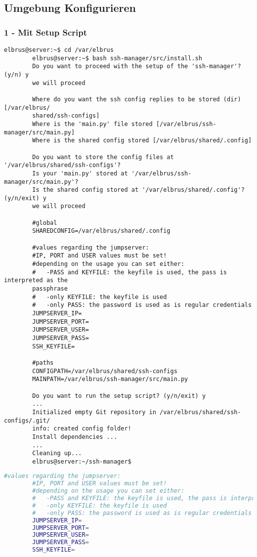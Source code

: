 	\subsection[file config]{Umgebung Konfigurieren}
	\subsubsection{1 - Mit Setup Script}
	
	\lstset{style=commands}
	\begin{lstlisting}[caption={Ausführen des 'install.sh' Scripts.}]
		elbrus@server:~$ cd /var/elbrus
		elbrus@server:~$ bash ssh-manager/src/install.sh
		Do you want to proceed with the setup of the 'ssh-manager'? (y/n) y
		we will proceed
		
		Where do you want the ssh config replies to be stored (dir) [/var/elbrus/
		shared/ssh-configs]
		Where is the 'main.py' file stored [/var/elbrus/ssh-manager/src/main.py]
		Where is the shared config stored [/var/elbrus/shared/.config]
		
		Do you want to store the config files at '/var/elbrus/shared/ssh-configs'?
		Is your 'main.py' stored at '/var/elbrus/ssh-manager/src/main.py'?
		Is the shared config stored at '/var/elbrus/shared/.config'? (y/n/exit) y
		we will proceed
		
		#global
		SHAREDCONFIG=/var/elbrus/shared/.config
		
		#values regarding the jumpserver:
		#IP, PORT and USER values must be set!
		#depending on the usage you can set either:
		#   -PASS and KEYFILE: the keyfile is used, the pass is interpreted as the
		passphrase
		#   -only KEYFILE: the keyfile is used
		#   -only PASS: the password is used as is regular credentials
		JUMPSERVER_IP=
		JUMPSERVER_PORT=
		JUMPSERVER_USER=
		JUMPSERVER_PASS=
		SSH_KEYFILE=
		
		#paths
		CONFIGPATH=/var/elbrus/shared/ssh-configs
		MAINPATH=/var/elbrus/ssh-manager/src/main.py
		
		Do you want to run the setup script? (y/n/exit) y
		...
		Initialized empty Git repository in /var/elbrus/shared/ssh-configs/.git/
		info: created config folder!
		Install dependencies ...
		...
		Cleaning up...
		elbrus@server:~/ssh-manager$
	\end{lstlisting}
	\newpage
	
	\lstset{style=files}
	\begin{lstlisting}[caption={Ergänzen der fehlenden Werten in '.env'.}, language=bash]
		#values regarding the jumpserver:
		#IP, PORT and USER values must be set!
		#depending on the usage you can set either:
		#   -PASS and KEYFILE: the keyfile is used, the pass is interpreted as the passphrase
		#   -only KEYFILE: the keyfile is used
		#   -only PASS: the password is used as is regular credentials
		JUMPSERVER_IP=
		JUMPSERVER_PORT=
		JUMPSERVER_USER=
		JUMPSERVER_PASS=
		SSH_KEYFILE=
	\end{lstlisting}
	
